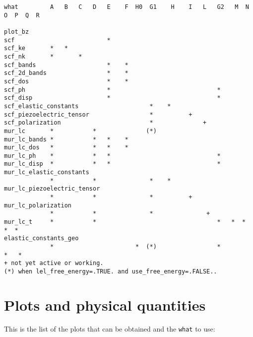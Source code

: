 \documentclass[12pt,a4paper,twoside]{report}
\begin{document}
\begin{footnotesize}
\begin{verbatim}
what         A   B   C   D   E    F  H0  G1    H    I   L   G2   M  N  O  P  Q  R

plot_bz
scf                          *
scf_ke       *   *
scf_nk       *       *
scf_bands                    *    *
scf_2d_bands                 *    *
scf_dos                      *    *
scf_ph                       *                              *
scf_disp                     *                              *
scf_elastic_constants                    *    *
scf_piezoelectric_tensor                 *          +
scf_polarization                         *              +
mur_lc       *           *              (*)
mur_lc_bands *           *   *    *
mur_lc_dos   *           *   *    *
mur_lc_ph    *           *   *                              *
mur_lc_disp  *           *   *                              *
mur_lc_elastic_constants
             *           *               *    *
mur_lc_piezoelectric_tensor
             *           *               *          +
mur_lc_polarization
             *           *               *               +
mur_lc_t     *           *                                  *   *  *  *  *
elastic_constants_geo
             *                       *  (*)                 *               *   *
+ not yet active or working.
(*) when lel_free_energy=.TRUE. and use_free_energy=.FALSE.. 
\end{verbatim}
\end{footnotesize}

\newpage
{\color{dark-blue}\chapter{Plots and physical quantities}}
\color{black}
This is the list of the plots that can be obtained and 
the \texttt{what} to use:
\end{document}
